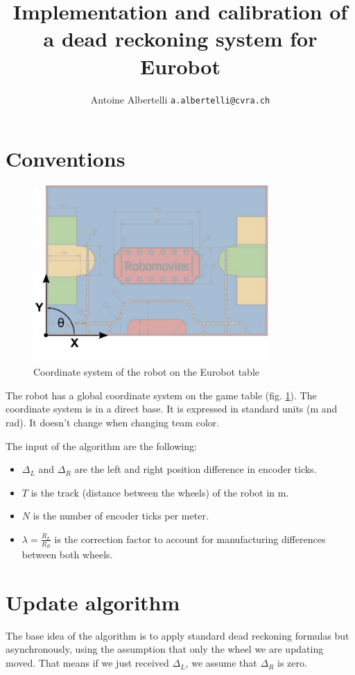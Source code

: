 \documentclass[a4paper]{paper}
\author{Antoine Albertelli \texttt{a.albertelli@cvra.ch}}
\title{Implementation and calibration of a dead reckoning system for Eurobot}
\begin{document}
\maketitle
\tableofcontents

\section{Conventions}
\begin{figure}[h]
    \begin{center}
        \includegraphics[width=0.8\textwidth]{table}
        \caption{Coordinate system of the robot on the Eurobot table}
        \label{fig:coordinates}
    \end{center}
\end{figure}

The robot has a global coordinate system on the game table (fig. \ref{fig:coordinates}).
The coordinate system is in a direct base.
It is expressed in standard units (\si{\meter} and \si{\radian}).
It doesn't change when changing team color.

The input of the algorithm are the following:
\begin{itemize}
    \item $\Delta_L$ and $\Delta_R$ are the left and right position difference in encoder ticks.
    \item $T$ is the track (distance between the wheels) of the robot in \si{\meter}.
    \item $N$ is the number of encoder ticks per meter.
    \item $\lambda = \frac{R_L}{R_R}$ is the correction factor to account for manufacturing differences between both wheels.
\end{itemize}

\section{Update algorithm}
The base idea of the algorithm is to apply standard dead reckoning formulas but asynchronously, using the assumption that only the wheel we are updating moved.
That means if we just received $\Delta_L$, we assume that $\Delta_R$ is zero.
\end{document}
